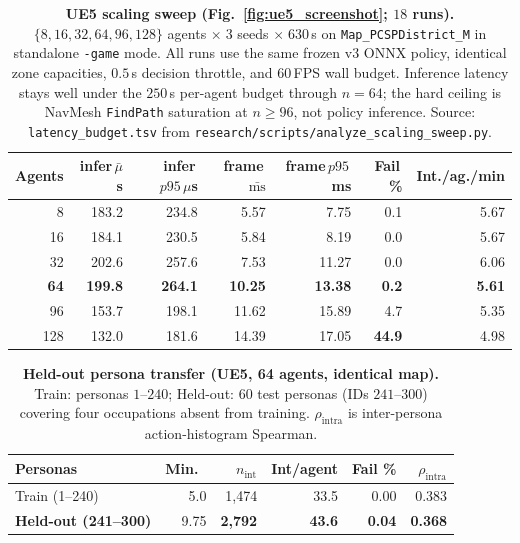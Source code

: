\documentclass[conference]{IEEEtran}
\begin{document}
\begin{table}[t]
  \centering
  \small
  \caption{%
    \textbf{UE5 scaling sweep (Fig.~\ref{fig:ue5_screenshot}; $18$ runs).}
    $\{8,16,32,64,96,128\}$ agents $\times\;3$ seeds $\times\;630$\,s on
    \texttt{Map\_PCSPDistrict\_M} in standalone \texttt{-game} mode.
    All runs use the same frozen v3 ONNX policy, identical zone
    capacities, $0.5$\,s decision throttle, and $60$\,FPS wall budget.
    Inference latency stays well under the $250$\,\textmu s per-agent budget
    through $n{=}64$; the hard ceiling is NavMesh \texttt{FindPath}
    saturation at $n{\geq}96$, not policy inference.
    Source: \texttt{latency\_budget.tsv} from
    \texttt{research/scripts/analyze\_scaling\_sweep.py}.}
  \label{tab:ue5_scaling}
  \setlength{\tabcolsep}{2pt}
  \scriptsize
  \begin{tabular}{rrrrrrr}
    \toprule
    Agents & infer\,$\bar{\mu}$s & infer\,$p95\,\mu$s & frame\,$\bar{\text{ms}}$ & frame\,$p95$\,ms & Fail\,\% & Int./ag./min \\
    \midrule
    8   & 183.2 & 234.8 &  5.57 &  7.75 &  0.1 & 5.67 \\
    16  & 184.1 & 230.5 &  5.84 &  8.19 &  0.0 & 5.67 \\
    32  & 202.6 & 257.6 &  7.53 & 11.27 &  0.0 & 6.06 \\
    \textbf{64}  & \textbf{199.8} & \textbf{264.1} & \textbf{10.25} & \textbf{13.38} & \textbf{0.2} & \textbf{5.61} \\
    96  & 153.7 & 198.1 & 11.62 & 15.89 &  4.7 & 5.35 \\
    128 & 132.0 & 181.6 & 14.39 & 17.05 & \textbf{44.9} & 4.98 \\
    \bottomrule
  \end{tabular}
\end{table}

\begin{table}[t]
  \centering
  \small
  \caption{%
    \textbf{Held-out persona transfer (UE5, 64 agents, identical map).}
    Train: personas $1$--$240$; Held-out: $60$ test personas (IDs
    $241$--$300$) covering four occupations absent from training.
    $\rho_{\text{intra}}$ is inter-persona action-histogram Spearman.}
  \label{tab:ue5_heldout}
  \setlength{\tabcolsep}{4pt}
  \begin{tabular}{lrrrrr}
    \toprule
    Personas & Min.\ & $n_{\text{int}}$ & Int/agent & Fail \% & $\rho_{\text{intra}}$ \\
    \midrule
    Train (1--240)   & 5.0  & 1{,}474 & 33.5 & 0.00 & 0.383 \\
    \textbf{Held-out (241--300)} & 9.75 & \textbf{2{,}792} & \textbf{43.6} & \textbf{0.04} & \textbf{0.368} \\
    \bottomrule
  \end{tabular}
\end{table}
\end{document}
